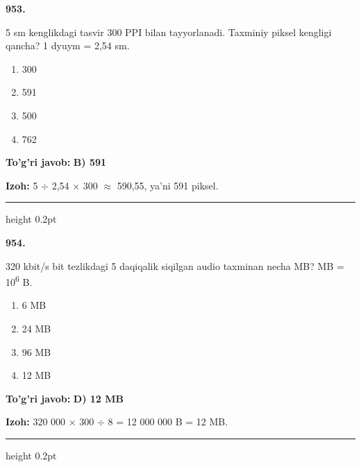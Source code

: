 \documentclass[10pt,a4paper,oneside]{article}
\begin{document}
\noindent\textbf{\color{ink}953.}
\par
5 sm kenglikdagi tasvir 300 PPI bilan tayyorlanadi. Taxminiy piksel kengligi qancha? 1 dyuym = 2,54 sm.
\begin{enumerate}[label=\Alph*),leftmargin=9mm]
\item 300
\item 591
\item 500
\item 762
\end{enumerate}
\begin{tcolorbox}[enhanced,breakable,colback=teal!4,colframe=teal!50!black,boxrule=0.5pt,arc=1.1mm,left=3mm,right=3mm,top=1.7mm,bottom=1.7mm,before skip=2mm,after skip=2mm]
\textbf{\color{teal}To'g'ri javob:} \textbf{B) 591}
\par\smallskip
\textbf{Izoh:} 5 \ensuremath{\div} 2,54 \ensuremath{\times} 300 \ensuremath{\approx} 590,55, ya'ni 591 piksel.
\end{tcolorbox}
\vspace{2mm}\hrule height 0.2pt \vspace{3mm}

\noindent\textbf{\color{ink}954.}
\par
320 kbit/s bit tezlikdagi 5 daqiqalik siqilgan audio taxminan necha MB? MB = 10\textsuperscript{6} B.
\begin{enumerate}[label=\Alph*),leftmargin=9mm]
\item 6 MB
\item 24 MB
\item 96 MB
\item 12 MB
\end{enumerate}
\begin{tcolorbox}[enhanced,breakable,colback=teal!4,colframe=teal!50!black,boxrule=0.5pt,arc=1.1mm,left=3mm,right=3mm,top=1.7mm,bottom=1.7mm,before skip=2mm,after skip=2mm]
\textbf{\color{teal}To'g'ri javob:} \textbf{D) 12 MB}
\par\smallskip
\textbf{Izoh:} 320 000 \ensuremath{\times} 300 \ensuremath{\div} 8 = 12 000 000 B = 12 MB.
\end{tcolorbox}
\vspace{2mm}\hrule height 0.2pt \vspace{3mm}
\end{document}
